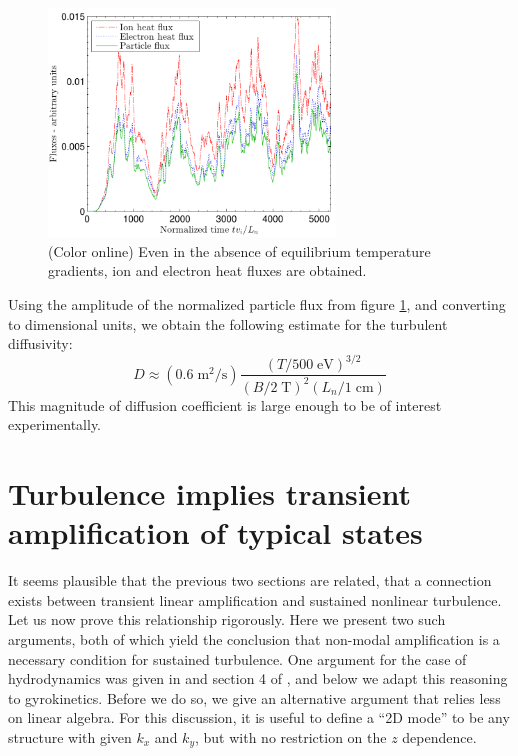 \documentclass[12pt,superscriptaddress]{revtex4}
\begin{document}
\begin{figure}[h!]
\includegraphics[width=3in]{m20140807_01_plotFluxesVsTimeForPaper.pdf}
\caption{(Color online)
Even in the absence of equilibrium temperature gradients, ion and electron heat fluxes
are obtained.
\label{fig:fluxes}}
\end{figure}

Using the amplitude of the normalized particle flux from figure \ref{fig:fluxes},
and converting to dimensional units, we obtain the following estimate for the turbulent diffusivity:
\begin{equation}
D \approx \left( 0.6 \mathrm{ \;m^2/s}\right)
\frac{\left(T / 500 \mathrm{\;eV}\right)^{3/2}}
{\left(B/2\mathrm{\;T}\right)^2 \left( L_n / 1 \mathrm{\;cm}\right)}
\end{equation}
This magnitude of diffusion coefficient is large enough to be of interest experimentally.


\section{Turbulence implies transient amplification of typical states}
\label{sec:proof}

It seems plausible that the previous two sections are related,
that a connection exists between transient linear amplification and sustained nonlinear turbulence.
Let us now prove this relationship rigorously.
Here we present two such arguments,
both of which yield the conclusion that non-modal amplification is a necessary condition
for sustained turbulence.  One argument for the case of hydrodynamics
was given in \cite{DelSoleNecessity} and section 4 of \cite{DelSoleSurvey},
and below we adapt this reasoning to gyrokinetics.  Before we do so, we give an alternative
argument that relies less on linear algebra.
For this discussion, it is useful to define a ``2D mode'' to be any structure with given $k_x$ and $k_y$,
but with no restriction on the $z$ dependence.
\end{document}
